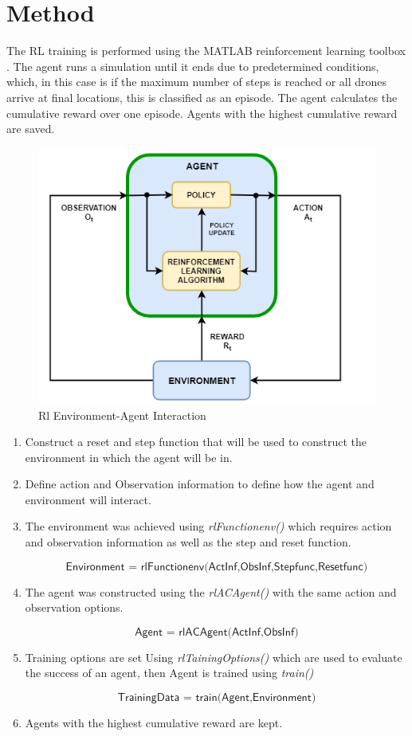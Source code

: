 \section{Method}
 The RL training is performed using the MATLAB reinforcement learning toolbox \cite{mtl1}. The agent runs a simulation until it ends due to predetermined conditions, which, in this case is if the maximum number of steps is reached or all drones arrive at final locations, this is classified as an episode. The agent calculates the cumulative reward over one episode. Agents with the highest cumulative reward are saved.
 \begin{figure}[h]
    \centering
    \includegraphics[width = 0.5\linewidth]{figures/MatlabRL.PNG}
    \caption{Rl Environment-Agent Interaction \cite{rl3}}
    \label{fig:my_label}
\end{figure}


\begin{enumerate}

    \item Construct a reset and step function that will be used to construct the environment in which the agent will be in.
    
    \item Define action and Observation information to define how the agent and environment will interact.

    \item The environment was achieved using \textit{rlFunctionenv()} which requires action and observation information as well as the step and reset function.

        \[\textsf{Environment =  rlFunctionenv(ActInf,ObsInf,Stepfunc,Resetfunc)}\]

    \item The agent was constructed using the \textit{rlACAgent()} with the same action and observation options. 
    
    \[\textsf{Agent =  rlACAgent(ActInf,ObsInf)}\]
    
    \item Training options are set Using \textit{rlTainingOptions()} which are used to evaluate the success of an agent, then Agent is trained using \textit{train()}
    
    \[\textsf{TrainingData =  train(Agent,Environment)}\]
    
    \item Agents with the highest cumulative reward are kept.
\end{enumerate} 
 
